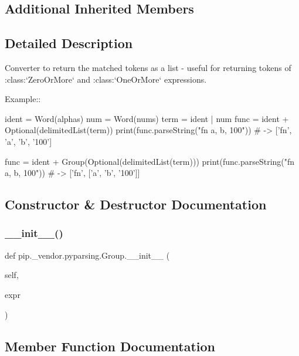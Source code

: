 \subsection*{Additional Inherited Members}


\subsection{Detailed Description}
\begin{DoxyVerb}Converter to return the matched tokens as a list - useful for
returning tokens of :class:`ZeroOrMore` and :class:`OneOrMore` expressions.

Example::

    ident = Word(alphas)
    num = Word(nums)
    term = ident | num
    func = ident + Optional(delimitedList(term))
    print(func.parseString("fn a, b, 100"))  # -> ['fn', 'a', 'b', '100']

    func = ident + Group(Optional(delimitedList(term)))
    print(func.parseString("fn a, b, 100"))  # -> ['fn', ['a', 'b', '100']]
\end{DoxyVerb}
 

\subsection{Constructor \& Destructor Documentation}
\mbox{\label{classpip_1_1__vendor_1_1pyparsing_1_1Group_a6ab829193f1a684c93990a695afe2d58}} 
\subsubsection{\texorpdfstring{\+\_\+\+\_\+init\+\_\+\+\_\+()}{\_\_init\_\_()}}
{\footnotesize\ttfamily def pip.\+\_\+vendor.\+pyparsing.\+Group.\+\_\+\+\_\+init\+\_\+\+\_\+ (\begin{DoxyParamCaption}\item[{}]{self,  }\item[{}]{expr }\end{DoxyParamCaption})}



\subsection{Member Function Documentation}
\mbox{\label{classpip_1_1__vendor_1_1pyparsing_1_1Group_a4b25029a879c4c3cbabea61af7676a98}} 
